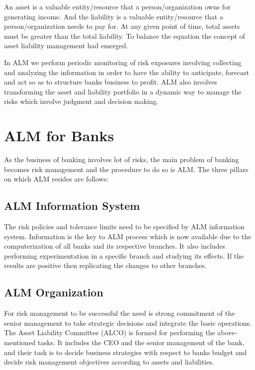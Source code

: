 	An asset is a valuable entity/resource that a person/organization owns for generating income.  And the liability is a valuable entity/resource that a person/organization needs to pay for. At any given point of time, total assets must be greater than the total liability. To balance the equation the concept of asset liability management \cite{11} had emerged. 

	In ALM we perform periodic monitoring of risk exposures involving collecting and analyzing the information in order to have the ability to anticipate, forecast and act so as to structure banks business to profit. ALM also involves transforming the asset and liability portfolio in a dynamic way to manage the risks which involve judgment and decision making.



	
\section{ALM for Banks}

	As the business of banking involves lot of risks, the main problem of banking becomes risk management and the procedure to do so is ALM. The three pillars on which ALM resides are follows:

	\subsection{ALM Information System}
		The risk policies and tolerance limits need to be specified by ALM information system. Information is the key to ALM process which is now available due to the computerization of all banks and its respective branches. It also includes performing experimentation in a specific branch and studying its effects. If the results are positive then replicating the changes to other branches.

	\subsection{ALM Organization}
		For risk management to be successful the need is strong commitment of the senior management to take strategic decisions and integrate the basic operations. The Asset Liability Committee (ALCO) is formed for performing the above-mentioned tasks. It includes the CEO and the senior management of the bank, and their task is to decide business strategies with respect to banks budget and decide risk management objectives according to assets and liabilities. 

